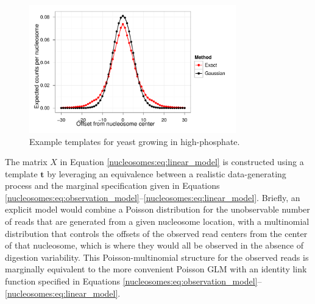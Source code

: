 \ifx\nofigures\undefined
\begin{figure}[t!]
\centering
 \includegraphics[width=0.8\textwidth]{figures/nucleosomes/plotTemplateVsApprox_H_1-combined}
 \caption{Example templates for yeast growing in high-phosphate.\label{nucleosomes:fig:template}} 
\end{figure}
\fi

The matrix $X$ in Equation \ref{nucleosomes:eq:linear_model} is constructed using a template $\bm t$ by leveraging an equivalence between a realistic data-generating process and the marginal specification given in Equations \ref{nucleosomes:eq:observation_model}--\ref{nucleosomes:eq:linear_model}.
%
Briefly, an explicit model would combine a Poisson distribution for the unobservable number of reads that are generated from a given nucleosome location, with a multinomial distribution that controls the offsets of the observed read centers from the center of that nucleosome, which is where they would all be observed in the absence of digestion variability.
%
This Poisson-multinomial structure for the observed reads is marginally equivalent to the more convenient Poisson GLM with an identity link function specified in Equations \ref{nucleosomes:eq:observation_model}--\ref{nucleosomes:eq:linear_model}.


